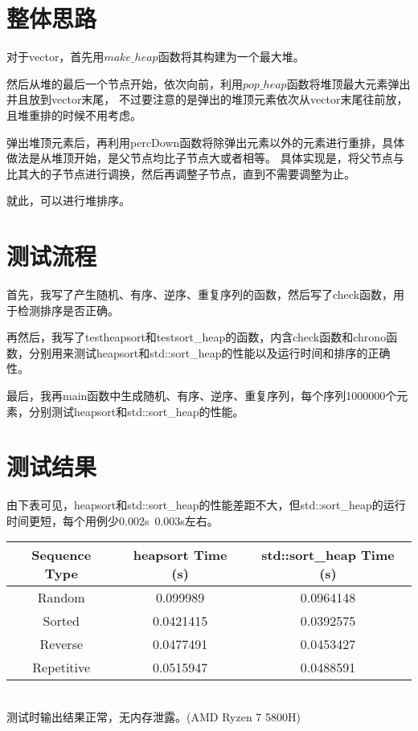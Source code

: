 \documentclass[UTF8]{ctexart}
\begin{document}
\pagestyle{fancy}
\fancyhead{}

\section{整体思路}
   对于vector，首先用$make\_heap$函数将其构建为一个最大堆。

   然后从堆的最后一个节点开始，依次向前，利用$pop\_heap$函数将堆顶最大元素弹出并且放到vector末尾，
   不过要注意的是弹出的堆顶元素依次从vector末尾往前放，且堆重排的时候不用考虑。

   弹出堆顶元素后，再利用percDown函数将除弹出元素以外的元素进行重排，具体做法是从堆顶开始，是父节点均比子节点大或者相等。
   具体实现是，将父节点与比其大的子节点进行调换，然后再调整子节点，直到不需要调整为止。

   就此，可以进行堆排序。

\section{测试流程}
首先，我写了产生随机、有序、逆序、重复序列的函数，然后写了check函数，用于检测排序是否正确。

再然后，我写了testheapsort和testsort\_heap的函数，内含check函数和chrono函数，分别用来测试heapsort和std::sort\_heap的性能以及运行时间和排序的正确性。

最后，我再main函数中生成随机、有序、逆序、重复序列，每个序列1000000个元素，分别测试heapsort和std::sort\_heap的性能。

\section{测试结果}   
由下表可见，heapsort和std::sort\_heap的性能差距不大，但std::sort\_heap的运行时间更短，每个用例少0.002s~0.003s左右。
\\
\begin{tabular}{|c|c|c|}
\hline
Sequence Type & heapsort Time (s) & std::sort\_heap Time (s) \\
\hline
Random & 0.099989 & 0.0964148 \\
Sorted & 0.0421415 & 0.0392575 \\
Reverse & 0.0477491 & 0.0453427 \\
Repetitive & 0.0515947 & 0.0488591 \\
\hline
\end{tabular}
    \\
测试时输出结果正常，无内存泄露。(AMD Ryzen 7 5800H)
\end{document}

